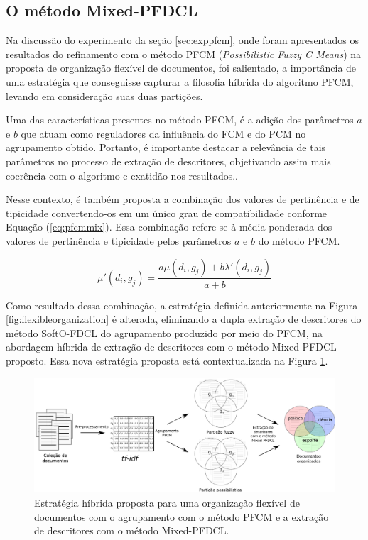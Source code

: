 \subsection{O método Mixed-PFDCL}

Na discussão do experimento da seção \ref{sec:exppfcm}, onde foram apresentados os resultados do
refinamento com o método PFCM ({\it Possibilistic Fuzzy C Means\/}) na proposta de organização
flexível de documentos, foi salientado, a importância de uma estratégia que conseguisse
capturar a filosofia híbrida do algoritmo PFCM, levando em consideração suas duas partições. 

Uma das características presentes no método PFCM, é a adição dos parâmetros $a$ e $b$ que atuam como
reguladores da influência do FCM e do PCM no agrupamento obtido. Portanto, é importante destacar a
relevância de tais parâmetros no processo de extração de descritores, objetivando
assim mais coerência com o algoritmo e exatidão nos resultados..

Nesse contexto, é também proposta a combinação dos valores de pertinência e de tipicidade
convertendo-os em um único grau de compatibilidade conforme Equação (\ref{eq:pfcmmix}). Essa
combinação refere-se à média ponderada dos valores de pertinência e tipicidade pelos parâmetros $a$
e $b$ do método PFCM.

\begin{equation}
  \mu'(d_i,g_j) = \frac{a \mu(d_i,g_j) + b \lambda'(d_i,g_j)}{a+b}
  \label{eq:pfcmmix}
\end{equation}

Como resultado dessa combinação, a estratégia definida anteriormente na Figura
\ref{fig:flexibleorganization} é alterada, eliminando a dupla extração de descritores do método
SoftO-FDCL do agrupamento produzido por meio do PFCM, na abordagem híbrida de extração de
descritores com o método Mixed-PFDCL proposto. Essa nova estratégia proposta está contextualizada na
Figura \ref{fig:pfdclprocess}.

\begin{figure}[!htp] 
  \centering
  \includegraphics[width=1.0\columnwidth]{assets/process_pfdcl.pdf} 
  \caption{Estratégia híbrida proposta para uma organização flexível de documentos com o 
  agrupamento com o método PFCM e a extração de descritores com o método Mixed-PFDCL.} 
  \label{fig:pfdclprocess} 
\end{figure}


